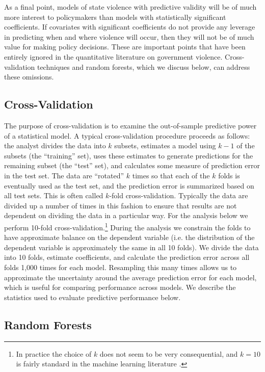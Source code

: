 \documentclass[12pt]{article}
\begin{document}
As a final point, models of state violence with predictive validity will be of much more interest to policymakers than models with statistically significant coefficients. If covariates with significant coefficients do not provide any leverage in predicting when and where violence will occur, then they will not be of much value for making policy decisions. These are important points that have been entirely ignored in the quantitative literature  on government violence. Cross-validation techniques and random forests, which we discuss below, can address these omissions.

\subsection{Cross-Validation}

The purpose of cross-validation is to examine the out-of-sample predictive power of a statistical model. A typical cross-validation procedure proceeds as follows: the analyst divides the data into $k$ subsets, estimates a model using $k-1$ of the subsets (the ``training'' set), uses these estimates to generate predictions for the remaining subset (the ``test'' set), and calculates some measure of prediction error in the test set. The data are ``rotated'' $k$ times so that each of the $k$ folds is eventually used as the test set, and the prediction error is summarized based on all test sets. This is often called $k$-fold cross-validation. Typically the data are divided up a number of times in this fashion to ensure that results are not dependent on dividing the data in a particular way. For the analysis below we perform 10-fold cross-validation.\footnote{In practice the choice of $k$ does not seem to be very consequential, and $k=10$ is fairly standard in the machine learning literature \citep[See, e.g.][]{HastieTibshiraniFriedman2008}.} During the analysis we constrain the folds to have approximate balance on the dependent variable (i.e. the distribution of the dependent variable is approximately the same in all 10 folds). We divide the data into 10 folds, estimate coefficients, and calculate the prediction error across all folds 1,000 times for each model.  Resampling this many times allows us to approximate the uncertainty around the average prediction error for each model, which is useful for comparing performance across models. We describe the statistics used to evaluate predictive performance below. 

\subsection{Random Forests}
\end{document}
